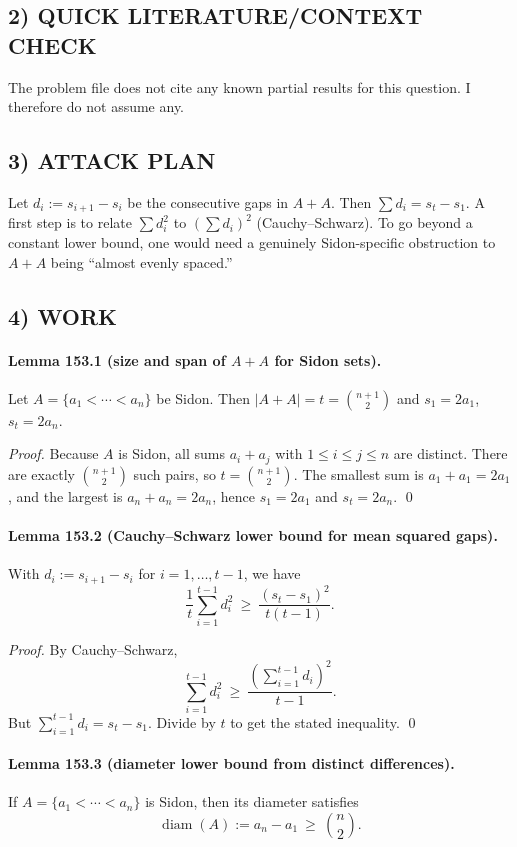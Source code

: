 \subsection*{2) QUICK LITERATURE/CONTEXT CHECK}
The problem file does not cite any known partial results for this question. I therefore do not assume any.

\subsection*{3) ATTACK PLAN}
Let $d_i:=s_{i+1}-s_i$ be the consecutive gaps in $A+A$. Then $\sum d_i=s_t-s_1$.
A first step is to relate $\sum d_i^2$ to $(\sum d_i)^2$ (Cauchy--Schwarz).
To go beyond a constant lower bound, one would need a genuinely Sidon-specific obstruction to $A+A$ being ``almost evenly spaced.''

\subsection*{4) WORK}
\paragraph{Lemma 153.1 (size and span of $A+A$ for Sidon sets).}
Let $A=\{a_1<\cdots<a_n\}$ be Sidon. Then $|A+A|=t=\binom{n+1}{2}$ and $s_1=2a_1$, $s_t=2a_n$.

\textit{Proof.}
Because $A$ is Sidon, all sums $a_i+a_j$ with $1\le i\le j\le n$ are distinct. There are exactly $\binom{n+1}{2}$ such pairs, so $t=\binom{n+1}{2}$.
The smallest sum is $a_1+a_1=2a_1$, and the largest is $a_n+a_n=2a_n$, hence $s_1=2a_1$ and $s_t=2a_n$. \qed

\paragraph{Lemma 153.2 (Cauchy--Schwarz lower bound for mean squared gaps).}
With $d_i:=s_{i+1}-s_i$ for $i=1,\dots,t-1$, we have
\[
\frac{1}{t}\sum_{i=1}^{t-1} d_i^2\ \ge\ \frac{(s_t-s_1)^2}{t(t-1)}.
\]

\textit{Proof.}
By Cauchy--Schwarz,
\[
\sum_{i=1}^{t-1} d_i^2\ \ge\ \frac{\left(\sum_{i=1}^{t-1} d_i\right)^2}{t-1}.
\]
But $\sum_{i=1}^{t-1} d_i = s_t-s_1$. Divide by $t$ to get the stated inequality. \qed

\paragraph{Lemma 153.3 (diameter lower bound from distinct differences).}
If $A=\{a_1<\cdots<a_n\}$ is Sidon, then its diameter satisfies
\[
\operatorname{diam}(A):=a_n-a_1\ \ge\ \binom{n}{2}.
\]


